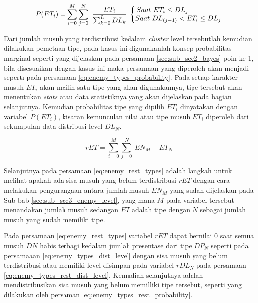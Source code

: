 \begin{equation}\label{eq:enemy_types_probability}
P(ET_{i}) = \sum_{i = 0}^{M} \sum_{j = 0}^{N}\ \frac{ET_{i}}{\sum_{k = 0}^{L}DL_{k}}\
\left\{\begin{matrix}
\hspace{-4.6em} Saat\ ET_{i} \leq DL_{j} \\ 
Saat\ DL_{(j-1)} < ET_{i} \leq DL_{j}
\end{matrix}\right.
\end{equation}

Dari jumlah musuh yang terdistribusi kedalam \textit{cluster} level tersebutlah kemudian dilakukan pemetaan tipe, pada kasus ini digunakanlah konsep probabilitas marginal seperti yang dijelaskan pada persamaan \ref{sec:sub_sec2_bayes} poin ke 1, bila disesuaikan dengan kasus ini maka persamaan yang diperoleh akan menjadi seperti pada persamaan \ref{eq:enemy_types_probability}. Pada setiap karakter musuh $ET_{i}$ akan meilih satu tipe yang akan digunakannya, tipe tersebut akan menentukan \textit{stats} atau data statistiknya yang akan dijelaskan pada bagian selanjutnya. Kemudian probabilitas tipe yang dipilih $ET_{i}$ dinyatakan dengan variabel $P(ET_{i})$, kisaran kemunculan nilai atau tipe musuh $ET_{i}$ diperoleh dari sekumpulan data distribusi level $DL_{N}$.

\begin{equation}\label{eq:enemy_rest_types}
rET = \sum_{i = 0}^{M} \sum_{j = 0}^{N}\ EN_{M} - ET_{N}
\end{equation}

Selanjutnya pada persamaan \ref{eq:enemy_rest_types} adalah langkah untuk melihat apakah ada sisa musuh yang belum terdistribusi $rET$ dengan cara melakukan pengurangaan antara jumlah musuh $EN_{M}$ yang sudah dijelaskan pada Sub-bab \ref{sec:sub_sec3_enemy_level}, yang mana $M$ pada variabel tersebut menandakan jumlah musuh sedangan $ET$ adalah tipe dengan  $N$ sebagai jumlah musuh yang sudah memiliki tipe. 
\vspace{1ex}

Pada persamaan \ref{eq:enemy_rest_types} variabel $rET$ dapat bernilai 0 saat semua musuh $DN$ habis terbagi kedalam jumlah presentase dari tipe $DP_{N}$ seperti pada persamaaan \ref{eq:enemy_types_dist_level} dengan sisa musuh yang belum terdistribusi atau memiliki level disimpan pada variabel $rDL_{N}$ pada persamaan \ref{eq:enemy_types_rest_dist_level}. Kemudian selanjutnya adalah mendistribusikan sisa musuh yang belum memilliki tipe tersebut, seperti yang dilakukan oleh persaman \ref{eq:enemy_types_rest_probability}.
\vspace{1ex}

